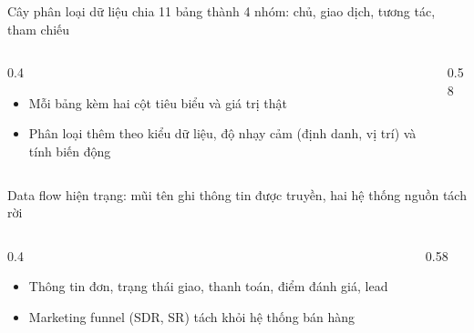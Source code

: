 \begin{frame}{Cây phân loại dữ liệu chia 11 bảng thành 4 nhóm: chủ, giao dịch, tương tác, tham chiếu}
\begin{columns}[T]\begin{column}{0.4\textwidth}
\begin{itemize}
  \item Mỗi bảng kèm hai cột tiêu biểu và giá trị thật
  \item Phân loại thêm theo kiểu dữ liệu, độ nhạy cảm (định danh, vị trí) và tính biến động
\end{itemize}
\end{column}\begin{column}{0.58\textwidth}
\begin{center}\end{center}
\end{column}\end{columns}

\end{frame}

\begin{frame}{Data flow hiện trạng: mũi tên ghi thông tin được truyền, hai hệ thống nguồn tách rời}
\begin{columns}[T]\begin{column}{0.4\textwidth}
\begin{itemize}
  \item Thông tin đơn, trạng thái giao, thanh toán, điểm đánh giá, lead
  \item Marketing funnel (SDR, SR) tách khỏi hệ thống bán hàng
\end{itemize}
\end{column}\begin{column}{0.58\textwidth}
\begin{center}\end{center}
\end{column}\end{columns}

\end{frame}

